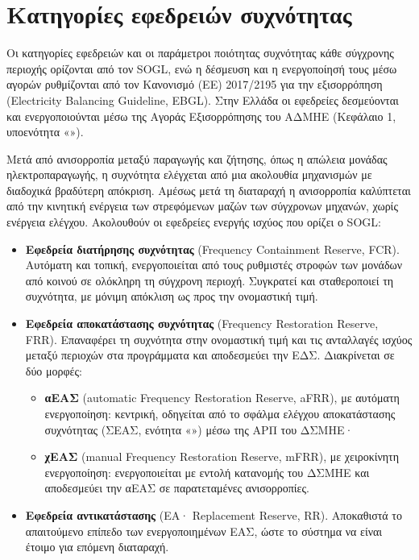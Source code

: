 \section{Κατηγορίες εφεδρειών συχνότητας}
\label{sec:reserves}

Οι κατηγορίες εφεδρειών και οι παράμετροι ποιότητας συχνότητας κάθε σύγχρονης περιοχής
ορίζονται από τον SOGL, ενώ η δέσμευση και η ενεργοποίησή τους μέσω αγορών ρυθμίζονται από
τον Κανονισμό (ΕΕ) 2017/2195 για την εξισορρόπηση (Electricity Balancing Guideline, EBGL). Στην
Ελλάδα οι εφεδρείες δεσμεύονται και ενεργοποιούνται μέσω της Αγοράς Εξισορρόπησης του ΑΔΜΗΕ
(Κεφάλαιο 1, υποενότητα «»).

Μετά από ανισορροπία μεταξύ παραγωγής και ζήτησης, όπως η απώλεια μονάδας ηλεκτροπαραγωγής, η
συχνότητα ελέγχεται από μια ακολουθία μηχανισμών με διαδοχικά βραδύτερη απόκριση. Αμέσως μετά
τη διαταραχή η ανισορροπία καλύπτεται από την κινητική ενέργεια των στρεφόμενων μαζών των
σύγχρονων μηχανών, χωρίς ενέργεια ελέγχου. Ακολουθούν οι εφεδρείες ενεργής ισχύος που ορίζει ο
SOGL:

\begin{itemize}
\item \textbf{Εφεδρεία διατήρησης συχνότητας} (Frequency Containment Reserve, FCR).
      Αυτόματη και τοπική, ενεργοποιείται από τους ρυθμιστές στροφών των μονάδων από κοινού σε
      ολόκληρη τη σύγχρονη περιοχή. Συγκρατεί και σταθεροποιεί τη συχνότητα, με μόνιμη
      απόκλιση ως προς την ονομαστική τιμή.
\item \textbf{Εφεδρεία αποκατάστασης συχνότητας} (Frequency Restoration Reserve, FRR).
      Επαναφέρει τη συχνότητα στην ονομαστική τιμή και τις ανταλλαγές ισχύος μεταξύ περιοχών
      στα προγράμματα και αποδεσμεύει την ΕΔΣ. Διακρίνεται σε δύο μορφές:
      \begin{itemize}
      \item \textbf{αΕΑΣ} (automatic Frequency Restoration Reserve, aFRR), με αυτόματη ενεργοποίηση: κεντρική, οδηγείται από το σφάλμα
            ελέγχου αποκατάστασης συχνότητας (ΣΕΑΣ, ενότητα «») μέσω της ΑΡΠ του
            ΔΣΜΗΕ·
      \item \textbf{χΕΑΣ} (manual Frequency Restoration Reserve, mFRR), με χειροκίνητη ενεργοποίηση: ενεργοποιείται με εντολή
            κατανομής του ΔΣΜΗΕ και αποδεσμεύει την αΕΑΣ σε παρατεταμένες ανισορροπίες.
      \end{itemize}
\item \textbf{Εφεδρεία αντικατάστασης} (ΕΑ· Replacement Reserve, RR). Αποκαθιστά το απαιτούμενο
      επίπεδο των ενεργοποιημένων ΕΑΣ, ώστε το σύστημα να είναι έτοιμο για επόμενη διαταραχή.
\end{itemize}


